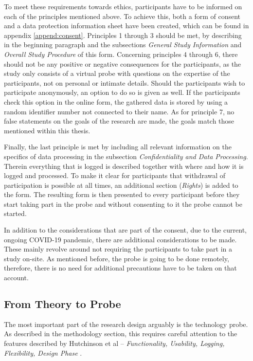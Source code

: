 To meet these requirements towards ethics, participants have to be informed on each of the principles mentioned above. To achieve this, both a form of consent and a data protection information sheet have been created, which can be found in appendix \ref{append:consent}. Principles 1 through 3 should be met, by describing in the beginning paragraph and the subsections \textit{General Study Information} and \textit{Overall Study Procedure} of this form. Concerning principles 4 through 6, there should not be any positive or negative consequences for the participants, as the study only consists of a virtual probe with questions on the expertise of the participants, not on personal or intimate details. Should the participants wish to participate anonymously, an option to do so is given as well. If the participants check this option in the online form, the gathered data is stored by using a random identifier number not connected to their name. As for principle 7, no false statements on the goals of the research are made, the goals match those mentioned within this thesis.

Finally, the last principle is met by including all relevant information on the specifics of data processing in the subsection \textit{Confidentiality and Data Processing}. Therein everything that is logged is described together with where and how it is logged and processed. To make it clear for participants that withdrawal of participation is possible at all times, an additional section (\textit{Rights}) is added to the form. The resulting form is then presented to every participant before they start taking part in the probe and without consenting to it the probe cannot be started.

In addition to the considerations that are part of the consent, due to the current, ongoing COVID-19 pandemic, there are additional considerations to be made. These mainly revolve around not requiring the participants to take part in a study on-site. As mentioned before, the probe is going to be done remotely, therefore, there is no need for additional precautions have to be taken on that account.

\subsection{From Theory to Probe}

The most important part of the research design arguably is the technology probe. As described in the methodology section, this requires careful attention to the features described by Hutchinson et al -- \textit{Functionality, Usability, Logging, Flexibility, Design Phase} \cite[p. 499-500]{hutchinson2003technology}.

